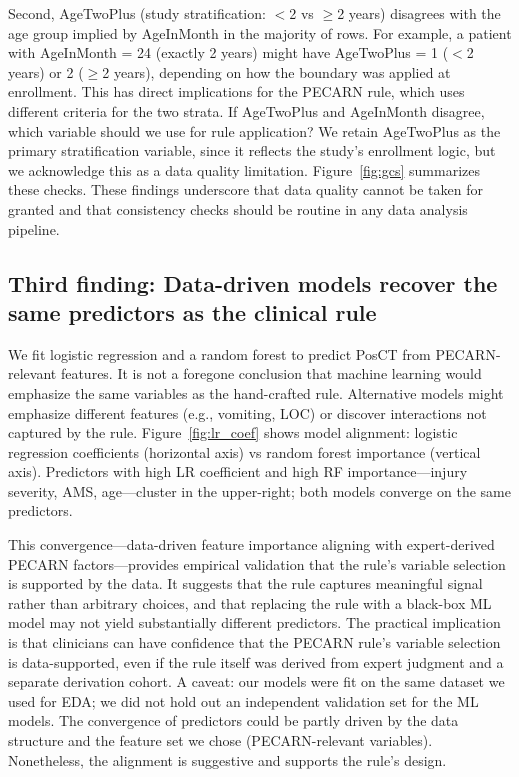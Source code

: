 \documentclass[10pt,letterpaper]{article}
\begin{document}
Second, AgeTwoPlus (study stratification: $<$2 vs $\ge$2 years) disagrees with the age group implied by AgeInMonth in the majority of rows. For example, a patient with AgeInMonth = 24 (exactly 2 years) might have AgeTwoPlus = 1 ($<$2 years) or 2 ($\ge$2 years), depending on how the boundary was applied at enrollment. This has direct implications for the PECARN rule, which uses different criteria for the two strata. If AgeTwoPlus and AgeInMonth disagree, which variable should we use for rule application? We retain AgeTwoPlus as the primary stratification variable, since it reflects the study's enrollment logic, but we acknowledge this as a data quality limitation. Figure~\ref{fig:gcs} summarizes these checks. These findings underscore that data quality cannot be taken for granted and that consistency checks should be routine in any data analysis pipeline.

\subsection{Third finding: Data-driven models recover the same predictors as the clinical rule}\label{third-finding}

We fit logistic regression and a random forest to predict PosCT from PECARN-relevant features. It is not a foregone conclusion that machine learning would emphasize the same variables as the hand-crafted rule. Alternative models might emphasize different features (e.g., vomiting, LOC) or discover interactions not captured by the rule. Figure~\ref{fig:lr_coef} shows model alignment: logistic regression coefficients (horizontal axis) vs random forest importance (vertical axis). Predictors with high LR coefficient and high RF importance---injury severity, AMS, age---cluster in the upper-right; both models converge on the same predictors.

This convergence---data-driven feature importance aligning with expert-derived PECARN factors---provides empirical validation that the rule's variable selection is supported by the data. It suggests that the rule captures meaningful signal rather than arbitrary choices, and that replacing the rule with a black-box ML model may not yield substantially different predictors. The practical implication is that clinicians can have confidence that the PECARN rule's variable selection is data-supported, even if the rule itself was derived from expert judgment and a separate derivation cohort. A caveat: our models were fit on the same dataset we used for EDA; we did not hold out an independent validation set for the ML models. The convergence of predictors could be partly driven by the data structure and the feature set we chose (PECARN-relevant variables). Nonetheless, the alignment is suggestive and supports the rule's design.
\end{document}
